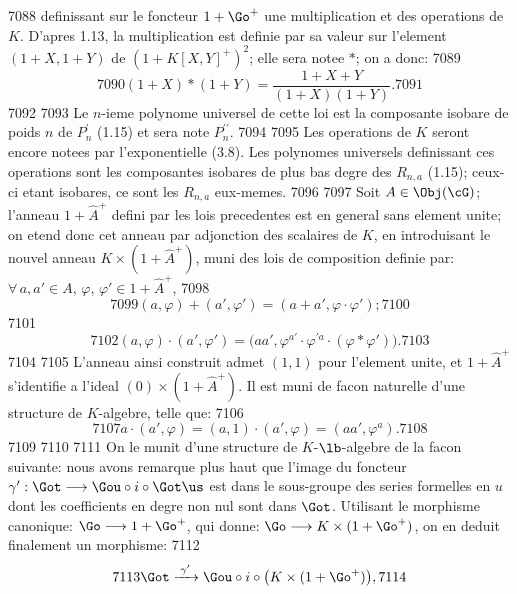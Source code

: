   7088	definissant sur le foncteur $1 + \Go^+$ une multiplication et des operations de $K$. D'apres 1.13, la multiplication est definie par sa valeur sur l'element $(1+X, 1+Y)$ de $(1+K[X,Y]^+)^2$; elle sera notee $*$; on a donc:
  7089	\begin{equation}\label{eq:6.1.1}
  7090	(1+X)*(1+Y) = \frac{1+X+Y}{(1+X)(1+Y)}.
  7091	\end{equation}
  7092	
  7093	Le $n$-ieme polynome universel de cette loi est la composante isobare de poids $n$ de $P^\prime_n$ (1.15) et sera note $P^{\prime\prime}_n$.
  7094	
  7095	Les operations de $K$ seront encore notees par l'exponentielle (3.8). Les polynomes universels definissant ces operations sont les composantes isobares de plus bas degre des $R_{n,a}$ (1.15); ceux-ci etant isobares, ce sont les $R_{n,a}$ eux-memes.
  7096	
  7097	Soit $A \in \Obj(\cG)$; l'anneau $1 + \widehat{A}^+$ defini par les lois precedentes est en general sans element unite; on etend donc cet anneau par adjonction des scalaires de $K$, en introduisant le nouvel anneau $K \times (1 + \widehat{A}^+)$, muni des lois de composition definie par: $\forall\, a, a' \in A$, $\varphi$, $\varphi' \in 1 + \widehat{A}^+$,
  7098	\[
  7099	(a, \varphi) + (a', \varphi') = (a+a', \varphi \cdot \varphi');
  7100	\]
  7101	\begin{equation}\label{eq:6.1.2}
  7102	(a, \varphi) \cdot (a', \varphi') = \bigl(aa', \varphi^{a'} \cdot \varphi^{\prime a} \cdot (\varphi * \varphi')\bigr).
  7103	\end{equation}
  7104	
  7105	L'anneau ainsi construit admet $(1,1)$ pour l'element unite, et $1 + \widehat{A}^+$ s'identifie a l'ideal $(0) \times (1 + \widehat{A}^+)$. Il est muni de facon naturelle d'une structure de $K$-algebre, telle que:
  7106	\begin{equation}\label{eq:6.1.3}
  7107	a \cdot (a', \varphi) = (a, 1) \cdot (a', \varphi) = (aa', \varphi^a).
  7108	\end{equation}
  7109	
  7110	\vspace{0.5em}
  7111	On le munit d'une structure de $K$-$\lb$-algebre de la facon suivante: nous avons remarque plus haut que l'image du foncteur $\gamma' : \Got \longrightarrow \Gou \circ i \circ \Got\us$ est dans le sous-groupe des series formelles en $u$ dont les coefficients en degre non nul sont dans $\Got$. Utilisant le morphisme canonique: $\Go \longrightarrow 1 + \Go^+$, qui donne: $\Go \longrightarrow K \times (1 + \Go^+)$, on en deduit finalement un morphisme:
  7112	\[
  7113	\Got \xrightarrow{\;\gamma'\;} \Gou \circ i \circ \bigl(K \times (1 + \Go^+)\bigr),
  7114	\]
